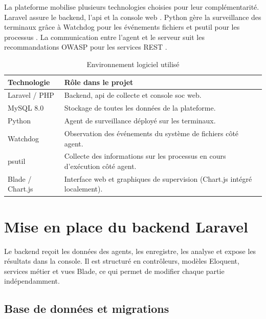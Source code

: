 La plateforme mobilise plusieurs technologies choisies pour leur complémentarité. Laravel assure le backend, l'\gls{api} et la console web \cite{laravelMigrations,laravelEloquent,laravelRouting}. Python gère la surveillance des terminaux grâce à Watchdog pour les événements fichiers et psutil pour les processus \cite{watchdogDocs,psutilDocs}. La communication entre l'agent et le serveur suit les recommandations OWASP pour les services REST \cite{owaspRestSecurity,owaspApiSecurity}.



\begin{table}[htbp]
\centering
\caption{Environnement logiciel utilisé}
\label{tab:environnement-logiciel}
\small
\renewcommand{\arraystretch}{1.3}
\begin{tabularx}{\textwidth}{|p{4cm}|X|}
\hline
\textbf{Technologie} & \textbf{Rôle dans le projet} \\
\hline
Laravel / PHP & Backend, \gls{api} de collecte et console \gls{soc} web. \\
\hline
MySQL 8.0 & Stockage de toutes les données de la plateforme. \\
\hline
Python & Agent de surveillance déployé sur les terminaux. \\
\hline
Watchdog & Observation des événements du système de fichiers côté agent. \\
\hline
psutil & Collecte des informations sur les processus en cours d'exécution côté agent. \\
\hline
Blade / Chart.js & Interface web et graphiques de supervision (Chart.js intégré localement). \\
\hline
\end{tabularx}
\end{table}

\newpage
\section{Mise en place du backend Laravel}

Le backend reçoit les données des agents, les enregistre, les analyse et expose les résultats dans la console. Il est structuré en contrôleurs, modèles Eloquent, services métier et vues Blade, ce qui permet de modifier chaque partie indépendamment.

\subsection{Base de données et migrations}

